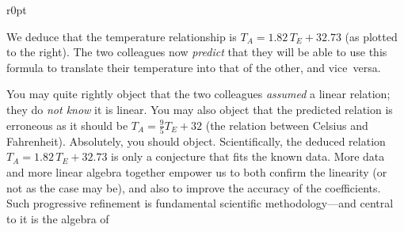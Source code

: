 \begin{example}
\begin{wrapfigure}[8]r{0pt}
\end{wrapfigure}
We deduce that the temperature relationship is \(T_A=1.82\,T_E+32.73\) (as plotted to the right).
The two colleagues now \emph{predict} that they will be able to use this formula to translate their temperature into that of the other, and vice~versa.

You may quite rightly object that the two colleagues \emph{assumed} a linear relation; they do \emph{not know} it is linear.
You may also object that the predicted relation is erroneous as it should be \(T_A=\frac95T_E+32\) (the relation between Celsius and Fahrenheit).
Absolutely, you should object.
Scientifically, the deduced relation  \(T_A=1.82\,T_E+32.73\) is only a conjecture that fits the known data.
More data and more linear algebra together empower us to both confirm the linearity (or not as the case may be), and also to improve the accuracy of the coefficients. 
Such progressive refinement is fundamental scientific methodology---and central to it is the algebra of 
\end{example}


